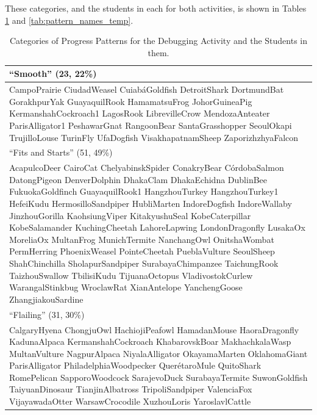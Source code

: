 These categories, and the students in each for both activities, is shown in Tables \ref{tab:pattern_names_debug} and \ref{tab:pattern_names_temp}.

\begin{table}
\begin{centering}
	\begin{tabular}{p{\textwidth}}
	\hline \hline
	``Smooth'' (23, 22\%)\\ \hline
		CampoPrairie		
		CiudadWeasel		
		CuiabáGoldfish		
		DetroitShark		
		DortmundBat			
		GorakhpurYak		
		GuayaquilRook		
		HamamatsuFrog		
		JohorGuineaPig		
		KermanshahCockroach1
		LagosRook			
		LibrevilleCrow		
		MendozaAnteater		
		ParisAlligator1		
		PeshawarGnat		
		RangoonBear			
		SantaGrasshopper	
		SeoulOkapi			
		TrujilloLouse		
		TurinFly			
		UfaDogfish			
		VisakhapatnamSheep	
		ZaporizhzhyaFalcon	\\ \hline \hline

	``Fits and Starts'' (51, 49\%)\\ \hline
		AcapulcoDeer		
		CairoCat			
		ChelyabinskSpider	
		ConakryBear		
		CórdobaSalmon	
		DatongPigeon		
		DenverDolphin		
		DhakaClam			
		DhakaEchidna		
		DublinBee			
		FukuokaGoldfinch	
		GuayaquilRook1	
		HangzhouTurkey	
		HangzhouTurkey1	
		HefeiKudu			
		HermosilloSandpiper
		HubliMarten		
		IndoreDogfish		
		IndoreWallaby		
		JinzhouGorilla	
		KaohsiungViper	
		KitakyushuSeal	
		KobeCaterpillar	
		KobeSalamander		
		KuchingCheetah		
		LahoreLapwing		
		LondonDragonfly		
		LusakaOx			
		MoreliaOx			
		MultanFrog			
		MunichTermite		
		NanchangOwl			
		OnitshaWombat
		PermHerring
		PhoenixWeasel
		PointeCheetah
		PueblaVulture
		SeoulSheep
		ShahChinchilla
		SholapurSandpiper
		SurabayaChimpanzee
		TaichungRook
		TaizhouSwallow
		TbilisiKudu
		TijuanaOctopus
		VladivostokCurlew
		WarangalStinkbug
		WroclawRat
		XianAntelope
		YanchengGoose
		ZhangjiakouSardine		\\ \hline \hline
	``Flailing'' (31, 30\%)\\ \hline
		CalgaryHyena
		ChongjuOwl
		HachiojiPeafowl
		HamadanMouse
		HaoraDragonfly
		KadunaAlpaca
		KermanshahCockroach
		KhabarovskBoar
		MakhachkalaWasp
		MultanVulture
		NagpurAlpaca
		NiyalaAlligator
		OkayamaMarten
		OklahomaGiant
		ParisAlligator
		PhiladelphiaWoodpecker
		QuerétaroMule
		QuitoShark
		RomePelican
		SapporoWoodcock
		SarajevoDuck
		SurabayaTermite
		SuwonGoldfish
		TaiyuanDinosaur
		TianjinAlbatross
		TripoliSandpiper
		ValenciaFox
		VijayawadaOtter
		WarsawCrocodile
		XuzhouLoris
		YaroslavlCattle	\\ \hline

	\end{tabular}
	\caption[Categories of Progress Patterns for the Debugging Activity and the Students in them]{Categories of Progress Patterns for the Debugging Activity and the Students in them.}
	\label{tab:pattern_names_debug}
\end{centering}
\end{table}

